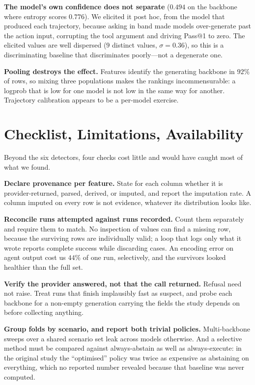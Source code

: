 \documentclass[conference]{IEEEtran}
\begin{document}
\textbf{The model's own confidence does not separate} ($0.494$ on the backbone
where entropy scores $0.776$). We elicited it post hoc, from the model that
produced each trajectory, because asking in band made models over-generate past
the action input, corrupting the tool argument and driving Pass@1 to zero. The
elicited values are well dispersed ($9$ distinct values, $\sigma=0.36$), so this
is a discriminating baseline that discriminates poorly---not a degenerate one.

\textbf{Pooling destroys the effect.} Features identify the generating backbone
in $92\%$ of rows, so mixing three populations makes the rankings
incommensurable: a logprob that is low for one model is not low in the same way
for another. Trajectory calibration appears to be a per-model exercise.

\section{Checklist, Limitations, Availability}

Beyond the six detectors, four checks cost little and would have caught most of
what we found.

\textbf{Declare provenance per feature.} State for each column whether it is
provider-returned, parsed, derived, or imputed, and report the imputation rate.
A column imputed on every row is not evidence, whatever its distribution looks
like.

\textbf{Reconcile runs attempted against runs recorded.} Count them separately
and require them to match. No inspection of values can find a missing row,
because the surviving rows are individually valid; a loop that logs only what it
wrote reports complete success while discarding cases. An encoding error on
agent output cost us $44\%$ of one run, selectively, and the survivors looked
healthier than the full set.

\textbf{Verify the provider answered, not that the call returned.} Refusal need
not raise. Treat runs that finish implausibly fast as suspect, and probe each
backbone for a non-empty generation carrying the fields the study depends on
before collecting anything.

\textbf{Group folds by scenario, and report both trivial policies.} Multi-backbone
sweeps over a shared scenario set leak across models otherwise. And a selective
method must be compared against always-abstain as well as always-execute: in the
original study the ``optimised'' policy was twice as expensive as abstaining on
everything, which no reported number revealed because that baseline was never
computed.
\end{document}
